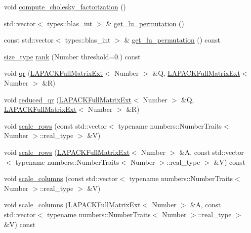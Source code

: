 \begin{DoxyCompactItemize}
\item 
void \hyperlink{classLAPACKFullMatrixExt_a6aaaec84d900ee2dface5b80614ce30f}{compute\+\_\+cholesky\+\_\+factorization} ()
\item 
std\+::vector$<$ types\+::blas\+\_\+int $>$ \& \hyperlink{classLAPACKFullMatrixExt_a623bea36c16f0320c2f750f5881f9214}{get\+\_\+lu\+\_\+permutation} ()
\item 
const std\+::vector$<$ types\+::blas\+\_\+int $>$ \& \hyperlink{classLAPACKFullMatrixExt_a2f435bd8d68ef6da859405ff5c583cd0}{get\+\_\+lu\+\_\+permutation} () const
\item 
\hyperlink{classLAPACKFullMatrixExt_a5cf5f4a6104dc17029210b5ca52bf574}{size\+\_\+type} \hyperlink{classLAPACKFullMatrixExt_a94f6a6df2b48201549f58bcbadcc6053}{rank} (Number threshold=0.) const
\item 
void \hyperlink{classLAPACKFullMatrixExt_a0413f3b6186f8e8fc0f2cb2e0cb5cc42}{qr} (\hyperlink{classLAPACKFullMatrixExt}{L\+A\+P\+A\+C\+K\+Full\+Matrix\+Ext}$<$ Number $>$ \&Q, \hyperlink{classLAPACKFullMatrixExt}{L\+A\+P\+A\+C\+K\+Full\+Matrix\+Ext}$<$ Number $>$ \&R)
\item 
void \hyperlink{classLAPACKFullMatrixExt_a2d29694b336c319402fd867658a25253}{reduced\+\_\+qr} (\hyperlink{classLAPACKFullMatrixExt}{L\+A\+P\+A\+C\+K\+Full\+Matrix\+Ext}$<$ Number $>$ \&Q, \hyperlink{classLAPACKFullMatrixExt}{L\+A\+P\+A\+C\+K\+Full\+Matrix\+Ext}$<$ Number $>$ \&R)
\item 
void \hyperlink{classLAPACKFullMatrixExt_aae9a6124afe70d17335d6338f323f22a}{scale\+\_\+rows} (const std\+::vector$<$ typename numbers\+::\+Number\+Traits$<$ Number $>$\+::real\+\_\+type $>$ \&V)
\item 
void \hyperlink{classLAPACKFullMatrixExt_a88b31beb3170825867a0b15b59770d61}{scale\+\_\+rows} (\hyperlink{classLAPACKFullMatrixExt}{L\+A\+P\+A\+C\+K\+Full\+Matrix\+Ext}$<$ Number $>$ \&A, const std\+::vector$<$ typename numbers\+::\+Number\+Traits$<$ Number $>$\+::real\+\_\+type $>$ \&V) const
\item 
void \hyperlink{classLAPACKFullMatrixExt_a75b2bb9434eb015f756747b943669fd7}{scale\+\_\+columns} (const std\+::vector$<$ typename numbers\+::\+Number\+Traits$<$ Number $>$\+::real\+\_\+type $>$ \&V)
\item 
void \hyperlink{classLAPACKFullMatrixExt_a2510d3bd30956bb2831b960796d3abca}{scale\+\_\+columns} (\hyperlink{classLAPACKFullMatrixExt}{L\+A\+P\+A\+C\+K\+Full\+Matrix\+Ext}$<$ Number $>$ \&A, const std\+::vector$<$ typename numbers\+::\+Number\+Traits$<$ Number $>$\+::real\+\_\+type $>$ \&V) const

\end{DoxyCompactItemize}

